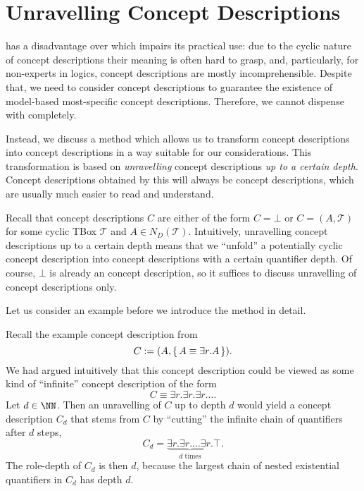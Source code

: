 \section{Unravelling \ELgfpbot Concept Descriptions}
\label{sec:unrav-elgfpb-conc}

\ELgfpbot has a disadvantage over \ELbot which impairs its practical use: due to the
cyclic nature of \ELgfpbot concept descriptions their meaning is often hard to grasp, and,
particularly, for non-experts in logics, \ELgfpbot concept descriptions are mostly
incomprehensible.  Despite that, we need to consider \ELgfpbot concept descriptions to
guarantee the existence of model-based most-specific concept descriptions.  Therefore, we
cannot dispense with \ELgfpbot completely.

Instead, we discuss a method which allows us to transform \ELgfpbot concept descriptions
into \ELbot concept descriptions in a way suitable for our considerations.  This
transformation is based on \emph{unravelling} \ELgfpbot concept descriptions \emph{up to a
  certain depth}.  Concept descriptions obtained by this will always be \ELbot concept
descriptions, which are usually much easier to read and understand.

Recall that \ELgfpbot concept descriptions $C$ are either of the form $C = \bot$ or $C =
(A, \mathcal{T})$ for some cyclic TBox $\mathcal{T}$ and $A \in N_D(\mathcal{T})$.
Intuitively, unravelling \ELgfpbot concept descriptions up to a certain depth means that
we \enquote{unfold} a potentially cyclic \ELgfpbot concept description into \ELbot concept
descriptions with a certain quantifier depth.  Of course, $\bot$ is already an \ELbot
concept description, so it suffices to discuss unravelling of \ELgfp concept descriptions
only.

Let us consider an example before we introduce the method in detail.

\begin{Example}
  \label{expl:unravelling}
  Recall the example concept description from 
  \begin{equation*}
    C := (A, {\{\, A \equiv \exists r. A \,\}}).
  \end{equation*}
  We had argued intuitively that this concept description could be viewed as some kind of
  \enquote{infinite} \ELbot concept description of the form
  \begin{equation*}
    C \equiv \exists r. \exists r. \exists r. \dots
  \end{equation*}
  Let $d \in \NN$.  Then an unravelling of $C$ up to depth $d$ would yield a concept
  description $C_d$ that stems from $C$ by \enquote{cutting} the infinite chain of quantifiers
  after $d$ steps, \ie
  \begin{equation*}
    C_d = \underbrace{\exists r. \exists r. \dots \exists r.}_{d \text{ times}} \top.
  \end{equation*}
  The role-depth of $C_d$ is then $d$, because the largest chain of nested existential
  quantifiers in $C_d$ has depth $d$.
\end{Example}

